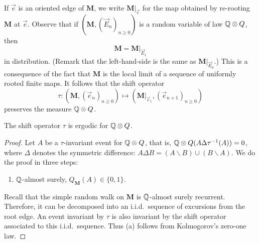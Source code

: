 \documentclass[a4paper]{article}
\newcommand*{\map}{\mathbf}
\newcommand*{\m}{\map{M}}
\newcommand*{\QM}{Q_{\map{M}}}
\newcommand*{\QQ}{\proba[Q]\otimes Q}
\newcommand*{\ve}[1][e]{\vec{#1}}
\newcommand*{\ven}[1][]{(\vec{e}_{n#1})_{n\ge 0}}
\begin{document}
If $\ve$ is an oriented edge of $\m $, we write $\m|_{\ve}$ for the map obtained by re-rooting $\m $ at $\ve$.
Observe that if $(\m,(\ve[E]_n)_{n\ge 0})$ is a random variable of law $\QQ$, then 
$$	\m  = \m|_{\ve[E]_1}	$$
in distribution. (Remark that the left-hand-side is the same as $\m|_{\ve[E]_0}$.)
This is a consequence of the fact that $\m $ is the local limit of a sequence of uniformly rooted finite maps.
It follows that the shift operator
$$	\tau: (\m,\ven) \mapsto (\m|_{\ve_1},\ven[+1])	$$
preserves the measure $\QQ$.

\begin{prop}
The shift operator $\tau$ is ergodic for $\QQ$.
\end{prop}

\begin{proof}
Let $A$ be a $\tau$-invariant event for $\QQ$, that is, $\QQ(A\Delta \tau^{-1}(A))=0$, where $\Delta$ denotes the symmetric difference: $A\Delta B = (A\backslash B)\cup (B\backslash A)$.
We do the proof in three steps:

\begin{enumerate}[label=(\alph*)]
\item	$\proba[Q]$-almost surely, $\QM(A)\in \{0,1\}$.
\end{enumerate}
Recall that the simple random walk on $\m $ is $\proba[Q]$-almost surely recurrent.
Therefore, it can be decomposed into an i.i.d.\ sequence of excursions from the root edge.
An event invariant by $\tau$ is also invariant by the shift operator associated to this i.i.d.\ sequence.
Thus (a) follows from Kolmogorov's zero-one law.



\end{proof}
\end{document}
